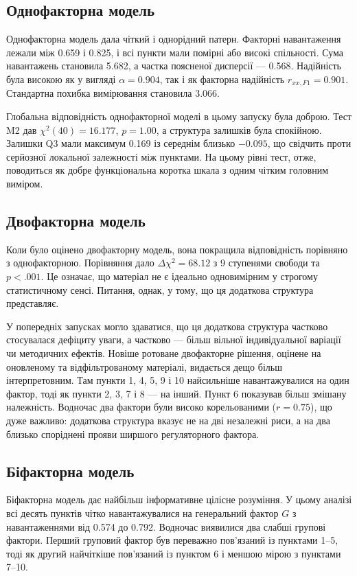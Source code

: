 \documentclass[11pt,a4paper]{article}
\begin{document}
\subsection{Однофакторна модель}
Однофакторна модель дала чіткий і однорідний патерн. Факторні навантаження лежали між 0.659 і 0.825, і всі пункти мали помірні або високі спільності. Сума навантажень становила 5.682, а частка поясненої дисперсії --- 0.568. Надійність була високою як у вигляді $\alpha = 0.904$, так і як факторна надійність $r_{xx,F1} = 0.901$. Стандартна похибка вимірювання становила 3.066.

Глобальна відповідність однофакторної моделі в цьому запуску була доброю. Тест M2 дав $\chi^2(40)=16.177$, $p=1.00$, а структура залишків була спокійною. Залишки Q3 мали максимум 0.169 із середнім близько $-0.095$, що свідчить проти серйозної локальної залежності між пунктами. На цьому рівні тест, отже, поводиться як добре функціональна коротка шкала з одним чітким головним виміром.

\subsection{Двофакторна модель}
Коли було оцінено двофакторну модель, вона покращила відповідність порівняно з однофакторною. Порівняння дало $\Delta \chi^2 = 68.12$ з 9 ступенями свободи та $p < .001$. Це означає, що матеріал не є ідеально одновимірним у строгому статистичному сенсі. Питання, однак, у тому, що ця додаткова структура представляє.

У попередніх запусках могло здаватися, що ця додаткова структура частково стосувалася дефіциту уваги, а частково --- більш вільної індивідуальної варіації чи методичних ефектів. Новіше ротоване двофакторне рішення, оцінене на оновленому та відфільтрованому матеріалі, видається дещо більш інтерпретовним. Там пункти 1, 4, 5, 9 і 10 найсильніше навантажувалися на один фактор, тоді як пункти 2, 3, 7 і 8 --- на інший. Пункт 6 показував більш змішану належність. Водночас два фактори були високо корельованими ($r = 0.75$), що дуже важливо: додаткова структура вказує не на дві незалежні риси, а на два близько споріднені прояви ширшого регуляторного фактора.

\subsection{Біфакторна модель}
Біфакторна модель дає найбільш інформативне цілісне розуміння. У цьому аналізі всі десять пунктів чітко навантажувалися на генеральний фактор $G$ з навантаженнями від 0.574 до 0.792. Водночас виявилися два слабші групові фактори. Перший груповий фактор був переважно пов'язаний із пунктами 1--5, тоді як другий найчіткіше пов'язаний із пунктом 6 і меншою мірою з пунктами 7--10.
\end{document}
